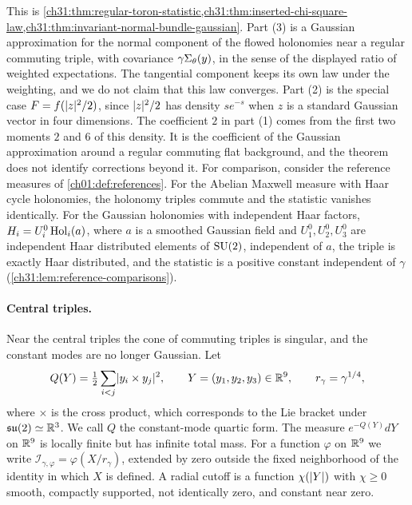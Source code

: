 This is \cref{ch31:thm:regular-toron-statistic,ch31:thm:inserted-chi-square-law,ch31:thm:invariant-normal-bundle-gaussian}. Part (3) is a Gaussian approximation for the normal component of the flowed holonomies near a regular commuting triple, with covariance $\gamma\Sigma_\theta(y)$, in the sense of the displayed ratio of weighted expectations. The tangential component keeps its own law under the weighting, and we do not claim that this law converges. Part (2) is the special case $F=f(\lvert z\rvert^2/2)$, since $\lvert z\rvert^2/2$ has density $se^{-s}$ when $z$ is a standard Gaussian vector in four dimensions. The coefficient $2$ in part (1) comes from the first two moments $2$ and $6$ of this density. It is the coefficient of the Gaussian approximation around a regular commuting flat background, and the theorem does not identify corrections beyond it. For comparison, consider the reference measures of \cref{ch01:def:references}. For the Abelian Maxwell measure with Haar cycle holonomies, the holonomy triples commute and the statistic vanishes identically. For the Gaussian holonomies with independent Haar factors, $H_i=U_i^0\operatorname{Hol}_i(a)$, where $a$ is a smoothed Gaussian field and $U_1^0,U_2^0,U_3^0$ are independent Haar distributed elements of $\mathrm{SU}(2)$, independent of $a$, the triple is exactly Haar distributed, and the statistic is a positive constant independent of $\gamma$ (\cref{ch31:lem:reference-comparisons}).

\paragraph{Central triples.}
Near the central triples the cone of commuting triples is singular, and the constant modes are no longer Gaussian. Let
\[
 Q(Y)=\tfrac12\sum_{i<j}\lvert y_i\times y_j\rvert^2,\qquad Y=(y_1,y_2,y_3)\in\mathbb R^9,\qquad r_\gamma=\gamma^{1/4},
\]
where $\times$ is the cross product, which corresponds to the Lie bracket under $\mathfrak{su}(2)\simeq\mathbb R^3$. We call $Q$ the constant-mode quartic form. The measure $e^{-Q(Y)}dY$ on $\mathbb R^9$ is locally finite but has infinite total mass. For a function $\varphi$ on $\mathbb R^9$ we write $\mathcal I_{\gamma,\varphi}=\varphi(X/r_\gamma)$, extended by zero outside the fixed neighborhood of the identity in which $X$ is defined. A radial cutoff is a function $\chi(\lvert Y\rvert)$ with $\chi\ge0$ smooth, compactly supported, not identically zero, and constant near zero.

